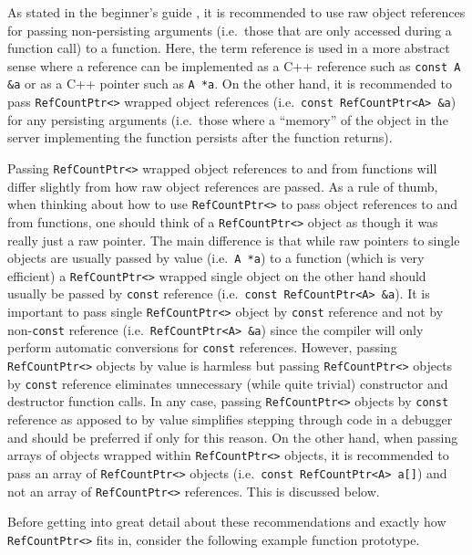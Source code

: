 As stated in the beginner's guide
{}\cite{ref:RefCountPtrBeginnersGuide}, it is recommended to use raw
object references for passing non-persisting arguments (i.e.~those that
are only accessed during a function call) to a function.  Here, the
term reference is used in a more abstract sense where a reference can
be implemented as a C++ reference such as {}\texttt{const A \&a} or as
a C++ pointer such as {}\texttt{A *a}.  On the other hand, it is
recommended to pass {}\texttt{Ref\-Count\-Ptr<>} wrapped object
references (i.e.~{}\texttt{const Ref\-Count\-Ptr<A> \&a}) for any
persisting arguments (i.e.~those where a ``memory'' of the object
in the server implementing the function persists after the function
returns).

Passing {}\texttt{Ref\-Count\-Ptr<>} wrapped object references to and
from functions will differ slightly from how raw object references are
passed.  As a rule of thumb, when thinking about how to use
{}\texttt{Ref\-Count\-Ptr<>} to pass object references to and from
functions, one should think of a {}\texttt{Ref\-Count\-Ptr<>} object
as though it was really just a raw pointer.  The main difference is
that while raw pointers to single objects are usually passed by value
(i.e.~{}\texttt{A *a}) to a function (which is very efficient) a
{}\texttt{Ref\-Count\-Ptr<>} wrapped single object on the other hand
should usually be passed by {}\texttt{const} reference
(i.e.~{}\texttt{const Ref\-Count\-Ptr<A> \&a}).  It is important to
pass single {}\texttt{Ref\-Count\-Ptr<>} object by {}\texttt{const}
reference and not by non-{}\texttt{const} reference
(i.e.~{}\texttt{Ref\-Count\-Ptr<A> \&a}) since the compiler will only
perform automatic conversions for {}\texttt{const} references.
However, passing {}\texttt{Ref\-Count\-Ptr<>} objects by value is
harmless but passing {}\texttt{Ref\-Count\-Ptr<>} objects by
{}\texttt{const} reference eliminates unnecessary (while quite
trivial) constructor and destructor function calls.  In any case,
passing {}\texttt{Ref\-Count\-Ptr<>} objects by {}\texttt{const}
reference as apposed to by value simplifies stepping through code in a
debugger and should be preferred if only for this reason.  On the
other hand, when passing arrays of objects wrapped within
{}\texttt{Ref\-Count\-Ptr<>} objects, it is recommended to pass an
array of {}\texttt{Ref\-Count\-Ptr<>} objects (i.e.~{}\texttt{const
Ref\-Count\-Ptr<A> a[]}) and not an array of
{}\texttt{Ref\-Count\-Ptr<>} references.  This is discussed below.

Before getting into great detail about these recommendations and
exactly how {}\texttt{Ref\-Count\-Ptr<>} fits in, consider the
following example function prototype.

